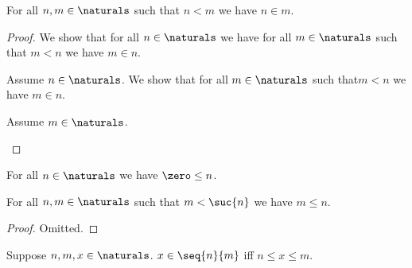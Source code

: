 \begin{proposition}\label{rless_eq_in_for_naturals}
    For all $n,m \in \naturals$ such that $n < m$ we have $n \in m$. 
\end{proposition}
\begin{proof}
    We show that for all $n \in \naturals$ we have for all $m \in \naturals$ such that $m < n$ we have $m \in n$.
    \begin{subproof}
        Assume $n \in \naturals$.
        We show that for all $m \in \naturals$ such that$m < n$ we have $m \in n$.
        \begin{subproof}
            Assume $m \in \naturals$.
        \end{subproof}
    \end{subproof}
    

    
\end{proof}



\begin{proposition}\label{naturals_leq}
    For all $n \in \naturals$ we have $\zero \leq n$.
\end{proposition}



\begin{proposition}\label{naturals_leq_on_suc}
    For all $n,m \in \naturals$ such that $m < \suc{n}$ we have $m \leq n$.
\end{proposition}
\begin{proof}
    Omitted.
\end{proof}

\begin{proposition}\label{x_in_seq_iff}
    Suppose $n,m,x \in \naturals$.
    $x \in \seq{n}{m}$ iff $n \leq x \leq m$.
\end{proposition}

